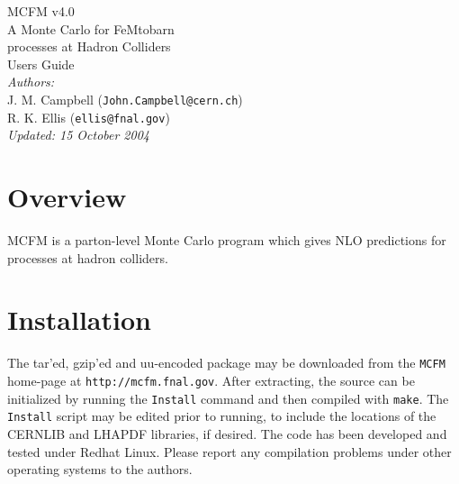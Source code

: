 \documentclass[12pt]{article}
\begin{document}
\def\GeV{\mbox{GeV}}

\thispagestyle{empty}
\vspace*{3cm}
\begin{center}
{\Huge MCFM v4.0} \\
\vspace*{0.5cm}
\Large{A Monte Carlo for FeMtobarn} \\
\Large{processes at Hadron Colliders} \\
\vspace*{2cm}
{\huge Users Guide} \\
\vspace*{4cm}
{\it Authors:} \\
\vspace*{0.2cm}
J. M. Campbell ({\tt John.Campbell@cern.ch}) \\
R. K. Ellis ({\tt ellis@fnal.gov}) \\
\vspace*{2.5cm}
{\it \small Updated: 15 October 2004}
\end{center}

\newpage

\section{Overview}

MCFM is a parton-level Monte Carlo program which gives NLO predictions
for processes at hadron colliders.
\section{Installation}

The tar'ed, gzip'ed and uu-encoded package may be downloaded from
the {\tt MCFM} home-page at {\tt http://mcfm.fnal.gov}.
After extracting, the source can be initialized by running the
{\tt Install} command and then compiled with {\tt make}. The
{\tt Install} script may be edited prior to running, to include
the locations of the CERNLIB and LHAPDF libraries, if desired.
The code has been developed and tested under Redhat Linux. Please report
any compilation problems under other operating systems to the authors.
\end{document}
